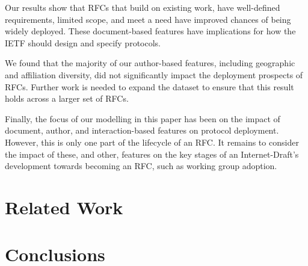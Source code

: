 \documentclass[twocolumn,10pt]{article}
\newcommand{\pb}[1]{\vspace{0.75ex}\noindent{\textbf{#1}}}
\begin{document}
\pb{Summary:}
Our results show that RFCs that build on existing work, have well-defined
requirements, limited scope, and meet a need have improved chances of being
widely deployed. These document-based features have implications for how
the IETF should design and specify protocols.

We found that the majority of our author-based features, including
geographic and affiliation diversity, did not significantly impact the
deployment prospects of RFCs. Further work is needed to expand the dataset
to ensure that this result holds across a larger set of RFCs.

Finally, the focus of our modelling in this paper has been on the impact of
document, author, and interaction-based features on protocol deployment.
However, this is only one part of the lifecycle of an RFC. It remains to
consider the impact of these, and other, features on the key stages of an
Internet-Draft's development towards becoming an RFC, such as working group
adoption.

\section{Related Work}
\label{sec:related}

%
%



\section{Conclusions}
\label{sec:conclusions}
\end{document}
